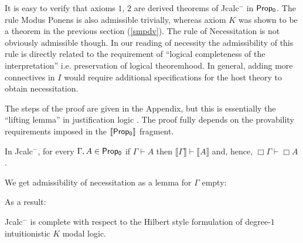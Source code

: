 	It is easy to verify that axioms $1$, $2$ are derived theorems of {\sf Jcalc$^{-}$} in ${\sf Prop_0}$. The rule Modus Ponens is also admissible trivially, whereas axiom $K$  was  
	shown to be a theorem in the previous section (\ref{smpdv}). The rule of Necessitation is not obviously admissible though. In our reading of necessity the
	admissibility of this rule is directly related to the requirement of ``logical completeness of the interpretation'' i.e. preservation of logical theoremhood.  
	In general, adding more connectives in $I$ would require additional specifications for the host theory to obtain necessitation.
	
	The steps of the proof are given in the Appendix, but this is essentially  the ``lifting lemma'' in justification logic \cite{Artemov2001}. 
	The proof fully depends on
	the provability requirements imposed in the $\llbracket{\sf Prop_0}\rrbracket$ fragment.
	\begin{theorem}
		In {\sf Jcalc$^{-}$}, for every  $\Gamma,   A \in {\sf Prop_0}$ if  $\Gamma\vdash A$ then  $\llbracket \Gamma\rrbracket\vdash\llbracket A\rrbracket $ and, hence, $\Box\Gamma \vdash \Box   A$.
	\end{theorem}
	We get admissibility of necessitation as a lemma for $\Gamma$ empty:
		
	As a result:
	\begin{theorem}[Completeness]
		{\sf Jcalc$^{-}$} is complete with respect to the Hilbert style formulation of degree-$1$ intuitionistic $K$ modal logic. 
	\end{theorem}
	
